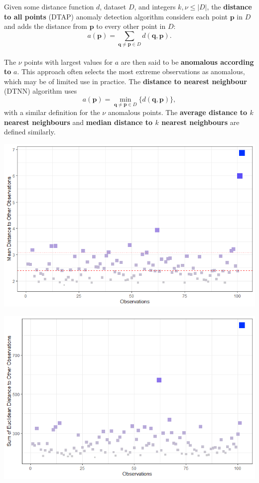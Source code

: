 \documentclass[20pt,landscape,footrule,headrule]{foils}
\newcommand{\newl}{\newline\newline}
\begin{document}
\newline\newline Given some distance function $d$, dataset $D$, and integers $k,\nu\leq |D|$, 
the \textbf{distance to all points} (DTAP) anomaly detection algorithm considers each point $\mathbf{p}$ in $D$ and adds the distance from $\mathbf{p}$ to every other point in $D$:
$$
a(\mathbf{p}) 
= \sum_{\mathbf{q}\neq \mathbf{p} \in D} d(\mathbf{q}, \mathbf{p}).
$$
\newpage\ \\ \noindent The $\nu$ points with largest values for $a$ are then said to be \textbf{anomalous according to} $a$. \newl This approach often selects the most extreme observations as anomalous, which may be of limited use in practice. 
\newl The \textbf{distance to nearest neighbour} (DTNN) algorithm uses 
$$
a(\mathbf{p}) 
= \min_{\mathbf{q}\neq \mathbf{p} \in D} \{d(\mathbf{q}, \mathbf{p})\},
$$
with a similar definition for the $\nu$ anomalous points. 
\newl The \textbf{average distance to $k$ nearest neighbours} and \textbf{median distance to $k$ nearest neighbours} are defined similarly. 
\newpage
\begin{center}
\includegraphics[width=\textwidth]{Images/AD_M}
\end{center}
\newpage
\begin{center}
\includegraphics[width=\textwidth]{Images/AD_L2_sum}
\end{center}
\end{document}
